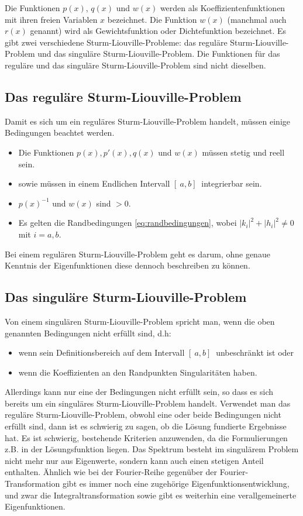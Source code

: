 Die Funktionen $p(x)$, $q(x)$ und $w(x)$ werden als Koeffizientenfunktionen mit ihren freien Variablen $x$ bezeichnet.
Die Funktion $w(x)$ (manchmal auch $r(x)$ genannt) wird als Gewichtsfunktion oder Dichtefunktion bezeichnet.
Es gibt zwei verschiedene Sturm-Liouville-Probleme: das reguläre Sturm-Liouville-Problem und das singuläre Sturm-Liouville-Problem. 
Die Funktionen für das reguläre und das singuläre Sturm-Liouville-Problem sind nicht dieselben.

\subsection{Das reguläre Sturm-Liouville-Problem\label{sub:reguläre_sturm_liouville_problem}}
Damit es sich um ein reguläres Sturm-Liouville-Problem handelt, müssen einige Bedingungen beachtet werden.

\begin{itemize}
	\item Die Funktionen $p(x), p'(x), q(x)$ und $w(x)$ müssen stetig und reell sein.
	\item sowie müssen in einem Endlichen Intervall $[ \ a,b] \ $ integrierbar sein.
	\item $p(x)^{-1}$ und $w(x)$ sind $>0$.
	\item Es gelten die Randbedingungen \ref{eq:randbedingungen}, wobei $|k_i|^2 + |h_i|^2\ne 0$ mit $i=a,b$.
\end{itemize}

Bei einem regulären Sturm-Liouville-Problem geht es darum, ohne genaue Kenntnis der Eigenfunktionen diese dennoch beschreiben zu können.


\subsection{Das singuläre Sturm-Liouville-Problem\label{sub:singuläre_sturm_liouville_problem}}
Von einem singulären Sturm-Liouville-Problem spricht man, wenn die oben genannten Bedingungen nicht erfüllt sind, d.h:

\begin{itemize}
	\item wenn sein Definitionsbereich auf dem Intervall $[ \ a,b] \ $ unbeschränkt ist oder
	\item wenn die Koeffizienten an den Randpunkten Singularitäten haben.
\end{itemize}

Allerdings kann nur eine der Bedingungen nicht erfüllt sein, so dass es sich bereits um ein singuläres Sturm-Liouville-Problem handelt.
Verwendet man das reguläre Sturm-Liouville-Problem, obwohl eine oder beide Bedingungen nicht erfüllt sind, dann ist es schwierig zu sagen, ob die Lösung fundierte Ergebnisse hat.
Es ist schwierig, bestehende Kriterien anzuwenden, da die Formulierungen z.B. in der Lösungsfunktion liegen.
Das Spektrum besteht im singulärem Problem nicht mehr nur aus Eigenwerte, sondern kann auch einen stetigen Anteil enthalten.
Ähnlich wie bei der Fourier-Reihe gegenüber der Fourier-Transformation gibt es immer noch eine zugehörige Eigenfunktionsentwicklung, und zwar die Integraltransformation sowie gibt es weiterhin eine verallgemeinerte Eigenfunktionen.

 




